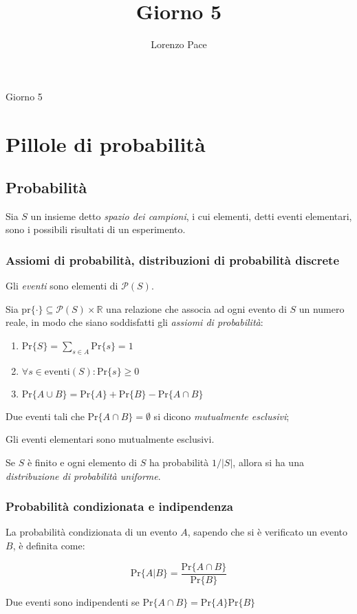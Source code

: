 \documentclass[a4paper,10pt]{article}
\title{Giorno 5}
\author{Lorenzo Pace}
\theoremstyle{definition}
\newcommand{\reals}{\mathbb{R}}
\begin{document}
\begin{center}
    \LARGE Giorno 5
    
\end{center}
\section{Pillole di probabilità}
\subsection{Probabilità}
Sia $S$ un insieme detto \emph{spazio dei campioni}, i cui elementi, detti eventi elementari, sono i possibili risultati di un esperimento. 
\subsubsection{Assiomi di probabilità, distribuzioni di probabilità discrete}
Gli \emph{eventi} sono elementi di $\mathcal{P}(S)$.\smallskip

Sia $\text{pr}\{\cdot\} \subseteq  \mathcal{P}(S) \times \reals$ una relazione che associa ad ogni evento di $S$ un numero reale, in modo che siano soddisfatti gli \emph{assiomi di probabilità}:
\begin{enumerate}
 \item $\text{Pr}\{S\} = \sum\limits_{s \in A} \text{Pr}\{s\} = 1$
 \item $\forall s \in \text{eventi}(S) : \text{Pr}\{s\} \geq 0$
 \item $\text{Pr}\{A \cup B\} = \text{Pr}\{A\} + \text{Pr}\{B\} - \text{Pr}\{A \cap B\}$
\end{enumerate}
Due eventi tali che $\text{Pr}\{A \cap B\} = \emptyset$ si dicono \emph{mutualmente esclusivi}; 

Gli eventi elementari sono mutualmente esclusivi.\bigskip

Se $S$ è finito e ogni elemento di $S$ ha probabilità $1/|S|$, allora si ha una \emph{distribuzione di probabilità uniforme}.
\subsubsection{Probabilità condizionata e indipendenza}
La probabilità condizionata di un evento $A$, sapendo che si è verificato un evento $B$, è definita come:

\[\text{Pr}\{A | B\} = \dfrac{\text{Pr}\{A \cap B\}}{\text{Pr}\{B\}}\]

Due eventi sono indipendenti se $\text{Pr}\{A \cap B\} = \text{Pr}\{A\}\text{Pr}\{B\}$
\end{document}
